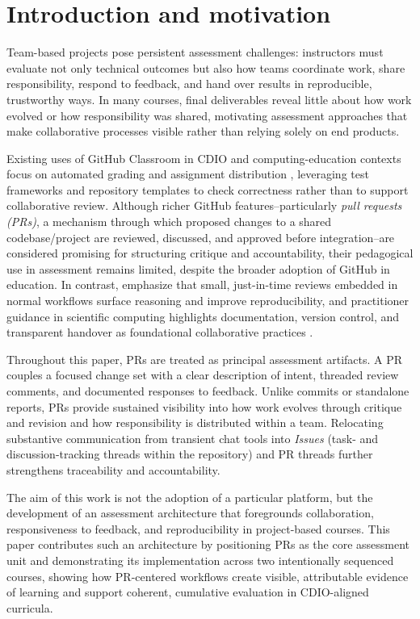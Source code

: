 \section{Introduction and motivation}
Team-based projects pose persistent assessment challenges: instructors must evaluate not only technical outcomes but also how teams coordinate work, share responsibility, respond to feedback, and hand over results in reproducible, trustworthy ways. In many courses, final deliverables reveal little about how work evolved or how responsibility was shared, motivating assessment approaches that make collaborative processes visible rather than relying solely on end products.

Existing uses of GitHub Classroom in CDIO and computing-education contexts focus on automated grading and assignment distribution \parencite{githubsurvey}, leveraging test frameworks and repository templates to check correctness rather than to support collaborative review. 
Although richer GitHub features--particularly \textit{pull requests (PRs)}, a mechanism through which proposed changes to a shared codebase/project are reviewed, discussed, and approved before integration--are considered promising for structuring critique and accountability, their pedagogical use in assessment remains limited, despite the broader adoption of GitHub in education.
In contrast, \textcite{PetreWilson2014WSSSPE} emphasize that small, just-in-time reviews embedded in normal workflows surface reasoning and improve reproducibility, and practitioner guidance in scientific computing highlights documentation, version control, and transparent handover as foundational collaborative practices \parencite{Wilson2017GoodEnough}.


Throughout this paper, PRs are treated as principal assessment artifacts. A PR couples a focused change set with a clear description of intent, threaded review comments, and documented responses to feedback. Unlike commits or standalone reports, PRs provide sustained visibility into how work evolves through critique and revision and how responsibility is distributed within a team. Relocating substantive communication from transient chat tools into \emph{Issues} (task- and discussion-tracking threads within the repository) and PR threads further strengthens traceability and accountability.

The aim of this work is not the adoption of a particular platform, but the development of an assessment architecture that foregrounds collaboration, responsiveness to feedback, and reproducibility in project-based courses. This paper contributes such an architecture by positioning PRs as the core assessment unit and demonstrating its implementation across two intentionally sequenced courses, showing how PR-centered workflows create visible, attributable evidence of learning and support coherent, cumulative evaluation in CDIO-aligned curricula.

